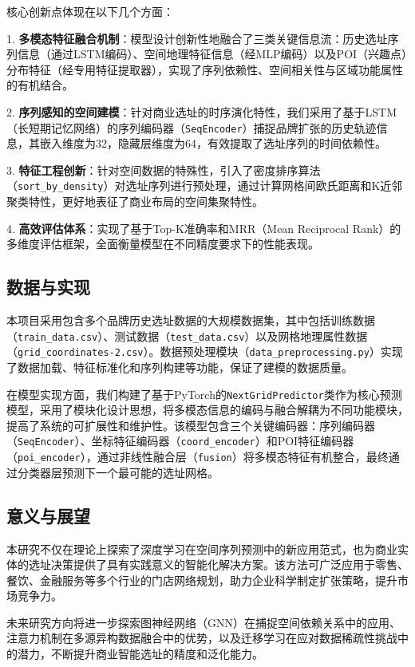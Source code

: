 \documentclass{article}
\begin{document}
核心创新点体现在以下几个方面：

1. \textbf{多模态特征融合机制}：模型设计创新性地融合了三类关键信息流：历史选址序列信息（通过LSTM编码）、空间地理特征信息（经MLP编码）以及POI（兴趣点）分布特征（经专用特征提取器），实现了序列依赖性、空间相关性与区域功能属性的有机结合。

2. \textbf{序列感知的空间建模}：针对商业选址的时序演化特性，我们采用了基于LSTM（长短期记忆网络）的序列编码器（\texttt{SeqEncoder}）捕捉品牌扩张的历史轨迹信息，其嵌入维度为32，隐藏层维度为64，有效提取了选址序列的时间依赖性。

3. \textbf{特征工程创新}：针对空间数据的特殊性，引入了密度排序算法（\texttt{sort\_by\_density}）对选址序列进行预处理，通过计算网格间欧氏距离和K近邻聚类特性，更好地表征了商业布局的空间集聚特性。

4. \textbf{高效评估体系}：实现了基于Top-K准确率和MRR（Mean Reciprocal Rank）的多维度评估框架，全面衡量模型在不同精度要求下的性能表现。

\subsection{数据与实现}
本项目采用包含多个品牌历史选址数据的大规模数据集，其中包括训练数据（\texttt{train\_data.csv}）、测试数据（\texttt{test\_data.csv}）以及网格地理属性数据（\texttt{grid\_coordinates-2.csv}）。数据预处理模块（\texttt{data\_preprocessing.py}）实现了数据加载、特征标准化和序列构建等功能，保证了建模的数据质量。

在模型实现方面，我们构建了基于PyTorch的\texttt{NextGridPredictor}类作为核心预测模型，采用了模块化设计思想，将多模态信息的编码与融合解耦为不同功能模块，提高了系统的可扩展性和维护性。该模型包含三个关键编码器：序列编码器（\texttt{SeqEncoder}）、坐标特征编码器（\texttt{coord\_encoder}）和POI特征编码器（\texttt{poi\_encoder}），通过非线性融合层（\texttt{fusion}）将多模态特征有机整合，最终通过分类器层预测下一个最可能的选址网格。

\subsection{意义与展望}
本研究不仅在理论上探索了深度学习在空间序列预测中的新应用范式，也为商业实体的选址决策提供了具有实践意义的智能化解决方案。该方法可广泛应用于零售、餐饮、金融服务等多个行业的门店网络规划，助力企业科学制定扩张策略，提升市场竞争力。

未来研究方向将进一步探索图神经网络（GNN）在捕捉空间依赖关系中的应用、注意力机制在多源异构数据融合中的优势，以及迁移学习在应对数据稀疏性挑战中的潜力，不断提升商业智能选址的精度和泛化能力。
\end{document}

